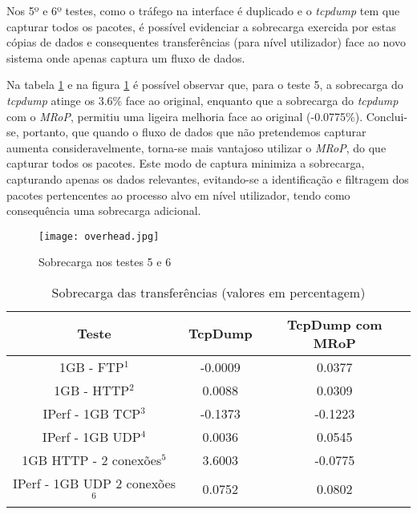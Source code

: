 Nos 5º e 6º testes, como o tráfego na interface é duplicado e o \textit{tcpdump} tem que capturar todos os pacotes, é possível evidenciar a sobrecarga exercida por estas cópias de dados e consequentes transferências (para nível utilizador) face ao novo sistema onde apenas captura um fluxo de dados.



Na tabela \ref{tab:overhead} e na figura \ref{fig:tests_overhead} é possível observar que, para o teste 5, a sobrecarga do \textit{tcpdump} atinge os 3.6\% face ao original, enquanto que a sobrecarga do \textit{tcpdump} com o \textit{MRoP}, permitiu uma ligeira melhoria face ao original (-0.0775\%).
Conclui-se, portanto, que quando o fluxo de dados que não pretendemos capturar aumenta consideravelmente, torna-se mais vantajoso utilizar o \textit{MRoP}, do que capturar todos os pacotes.
Este modo de captura minimiza a sobrecarga, capturando apenas os dados relevantes, evitando-se a identificação e filtragem dos pacotes pertencentes ao processo alvo em nível utilizador, tendo como consequência uma sobrecarga adicional.

\begin{figure}[!ht]
\centering
\texttt{[image: overhead.jpg]}
\caption{Sobrecarga nos testes 5 e 6 }
\label{fig:tests_overhead}
\end{figure}


\begin{table}[!htb]
\begin{center}
\caption{Sobrecarga das transferências (valores em percentagem)}
\begin{tabular}{ | c | c | c |}
\hline
Teste & \hspace {0.3cm} TcpDump \hspace {0.3cm} & TcpDump com MRoP  \\

\hline
1GB - FTP$^{1}$ & -0.0009  & 0.0377  \\
1GB - HTTP$^{2}$ & 0.0088 &  0.0309   \\
IPerf - 1GB TCP$^{3}$ & -0.1373 &  -0.1223   \\
IPerf - 1GB UDP$^{4}$ & 0.0036 & 0.0545 \\
\hline
\hline
1GB HTTP - 2 conexões$^{5}$ & 3.6003 & -0.0775   \\
IPerf - 1GB UDP 2 conexões$^{6}$ & 0.0752 & 0.0802   \\
\hline
\end{tabular}
\label{tab:overhead}
\end{center}
\end{table}

